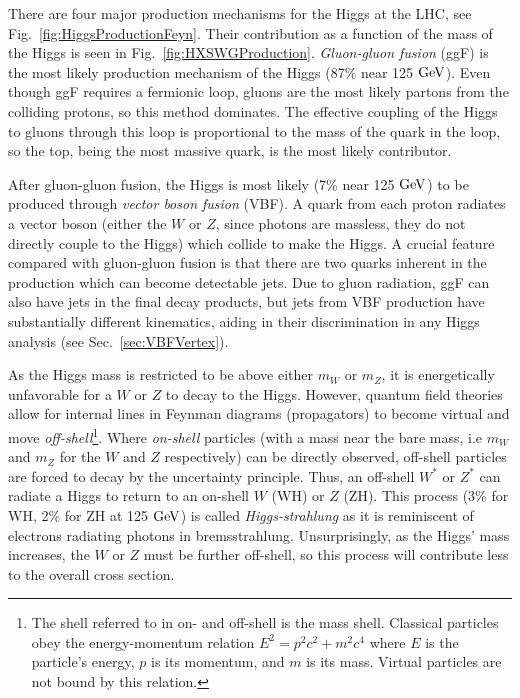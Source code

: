 There are four major production mechanisms for the Higgs at the LHC, see Fig.~\ref{fig:HiggsProductionFeyn}. Their contribution as a function of the mass of the Higgs is seen in Fig.~\ref{fig:HXSWGProduction}. \textit{Gluon-gluon fusion} (ggF) is the most likely production mechanism of the Higgs (87\% near 125 $\rm{GeV}$). Even though ggF requires a fermionic loop, gluons are the most likely partons from the colliding protons, so this method dominates. The effective coupling of the Higgs to gluons through this loop is proportional to the mass of the quark in the loop, so the top, being the most massive quark, is the most likely contributor. 

After gluon-gluon fusion, the Higgs is most likely (7\% near 125 $\rm{GeV}$) to be produced through \textit{vector boson fusion} (VBF). A quark from each proton radiates a vector boson (either the $W$ or $Z$, since photons are massless, they do not directly couple to the Higgs) which collide to make the Higgs. A crucial feature compared with gluon-gluon fusion is that there are two quarks inherent in the production which can become detectable jets. Due to gluon radiation, ggF can also have jets in the final decay products, but jets from VBF production have substantially different kinematics, aiding in their discrimination in any Higgs analysis (see Sec.~\ref{sec:VBFVertex}).

As the Higgs mass is restricted to be above either $m_W$ or $m_Z$, it is energetically unfavorable for a $W$ or $Z$ to decay to the Higgs. However, quantum field theories allow for internal lines in Feynman diagrams (propagators) to become virtual and move \textit{off-shell}\footnote{The shell referred to in on- and off-shell is the mass shell. Classical particles obey the energy-momentum relation $E^2=p^2c^2 + m^2c^4$ where $E$ is the particle's energy, $p$ is its momentum, and $m$ is its mass. Virtual particles are not bound by this relation.}. Where \textit{on-shell} particles (with a mass near the bare mass, i.e $m_W$ and $m_Z$ for the $W$ and $Z$ respectively) can be directly observed, off-shell particles are forced to decay by the uncertainty principle. Thus, an off-shell $W^*$ or $Z^*$ can radiate a Higgs to return to an on-shell $W$ (WH) or $Z$ (ZH). This process (3\% for WH, 2\% for ZH at 125 $\rm{GeV}$) is called \textit{Higgs-strahlung} as it is reminiscent of electrons radiating photons in bremsstrahlung. Unsurprisingly, as the Higgs' mass increases, the $W$ or $Z$ must be further off-shell, so this process will contribute less to the overall cross section.

